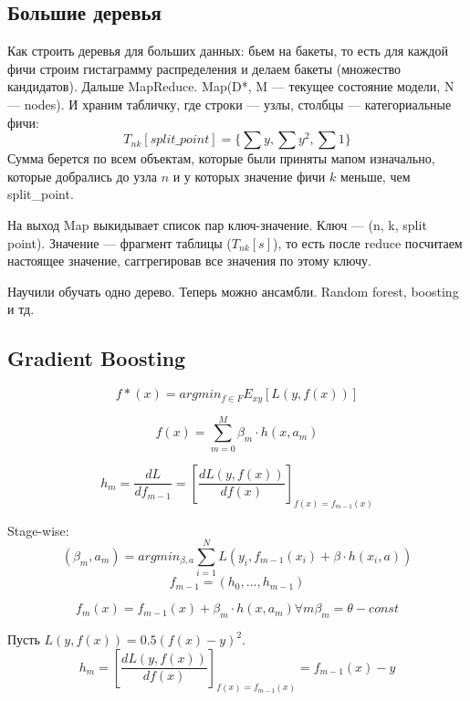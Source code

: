 \subsection{Большие деревья}
\quad Как строить деревья для больших данных: бьем на бакеты, то есть для каждой фичи строим гистаграмму распределения и делаем бакеты (множество кандидатов). Дальше MapReduce. Map(D*, M --- текущее состояние модели, N --- nodes). И храним табличку, где строки --- узлы, столбцы --- категориальные фичи:
$$T_{nk}[split\_point] = \{\sum y, \sum y^2, \sum 1\}$$
Сумма берется по всем объектам, которые были приняты мапом изначально, которые добрались до узла $n$ и у которых значение фичи $k$ меньше, чем split\_point.

На выход Map выкидывает список пар ключ-значение. Ключ --- (n, k, split point). Значение --- фрагмент таблицы ($T_{nk}[s]$), то есть после reduce посчитаем настоящее значение, саггрегировав все значения по этому ключу.

Научили обучать одно дерево. Теперь можно ансамбли. Random forest, boosting и тд.

\subsection{Gradient Boosting}
$$f*(x) = argmin_{f\in F} E_{xy}[L(y, f(x))]$$

$$f(x) = \sum_{m=0}^{M}{\beta_m \cdot h(x, a_m)}$$

$$h_m = \frac{dL}{df_{m-1}} = [\frac{dL(y, f(x))}{df(x)}]_{f(x)=f_{m-1}(x)}$$

Stage-wise:
$$(\beta_m, a_m) = argmin_{\beta, a} \sum_{i=1}^N{L(y_i, f_{m-1}(x_i) + \beta \cdot h(x_i, a))}$$
$$f_{m-1}=(h_0, ..., h_{m-1})$$

$$f_m(x)=f_{m-1}(x) + \beta_m \cdot h(x, a_m) \forall m \beta_m = \theta-const$$

Пусть $L(y, f(x))=0.5(f(x)-y)^2$.
$$h_m=[\frac{dL(y,f(x))}{df(x)}]_{f(x) = f_{m-1}(x)} = f_{m-1}(x) - y$$
